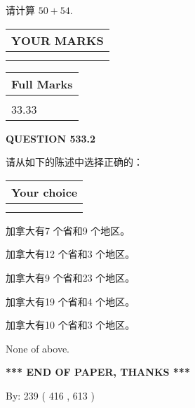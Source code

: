 \documentclass{ctexart}
\begin{document}
  
 
请计算 $ %
50 +  %
54 $.
 

 

 
  
\vspace{0.2in}
  
\noindent\begin{tabular}{|l|}
\hline
 YOUR MARKS  \\
\hline
 \\ 
 \\ 
\hline
\end{tabular}
\hspace{0.05in} \begin{tabular}{|l|}
\hline
 Full Marks  \\
\hline
 \\ 
33.33 \\
\hline
\end{tabular}
{\textbf{\Large{QUESTION
533.2 
}}}
  
  
请从如下的陈述中选择正确的：
  
  
\noindent\hspace{3.0in} \begin{tabular}{|l|}
\hline
Your choice \\
\hline
 \\ 
 \\ 
\hline
\end{tabular}
  
  
 
 
加拿大有7 个省和9 个地区。
 
 
加拿大有12 个省和3 个地区。
 
 
加拿大有9 个省和23 个地区。
 
 
加拿大有19 个省和4 个地区。
 
 
加拿大有10 个省和3 个地区。
 
 
 None of above.
 
 
   
   
 \vspace{0.2in}
 
   
   
   
   
\vspace{1.0in} 
{\textbf{\large{ *** END OF PAPER, THANKS *** }}} 
   
   
\hspace{1.0in} By: 
 239 ( 416 ,  613 )
   
\end{document}
